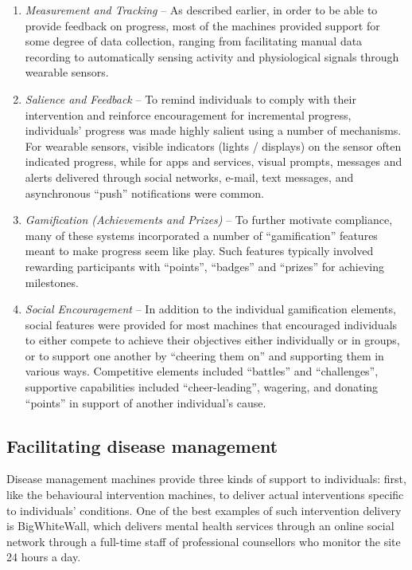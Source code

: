 \documentclass{sig-alternate}
\begin{document}
\begin{enumerate}
\item \emph{Measurement and Tracking} -- As described earlier, in order
  to be able to provide feedback on progress, most of the machines
  provided support for some degree of data collection, ranging from
  facilitating manual data recording to automatically sensing activity
  and physiological signals through wearable sensors.
\item \emph{Salience and Feedback} -- To remind individuals to comply
  with their intervention and reinforce encouragement for incremental
  progress, individuals' progress was made highly salient using a
  number of mechanisms.  For wearable sensors, visible indicators
  (lights / displays) on the sensor often indicated progress, while for
  apps and services, visual prompts, messages and alerts delivered
  through social networks, e-mail, text messages, and asynchronous
  ``push'' notifications were common.
\item \emph{Gamification (Achievements and Prizes)} -- To further
  motivate compliance, many of these systems incorporated a number of
  ``gamification'' features \cite{Deterding:2011:GUG:1979742.1979575}
  meant to make progress seem like play.  Such features typically
  involved rewarding participants with ``points'', ``badges'' and
  ``prizes'' for achieving milestones.
\item \emph{Social Encouragement} -- In addition to the individual
  gamification elements, social features were provided for most
  machines that encouraged individuals to either compete to achieve
  their objectives either individually or in groups, or to support one
  another by ``cheering them on'' and supporting them in various ways.
  Competitive elements included ``battles'' and ``challenges'', supportive
  capabilities included ``cheer-leading'', wagering, and donating ``points''
  in support of another individual's cause.
\end{enumerate}

\subsection{Facilitating disease management}
Disease management machines provide three kinds of support to
individuals: first, like the behavioural intervention machines, to
deliver actual interventions specific to individuals' conditions.  One
of the best examples of such intervention delivery is BigWhiteWall,
which delivers mental health services through an online social network
through a full-time staff of professional counsellors who monitor the
site 24 hours a day.
\end{document}
